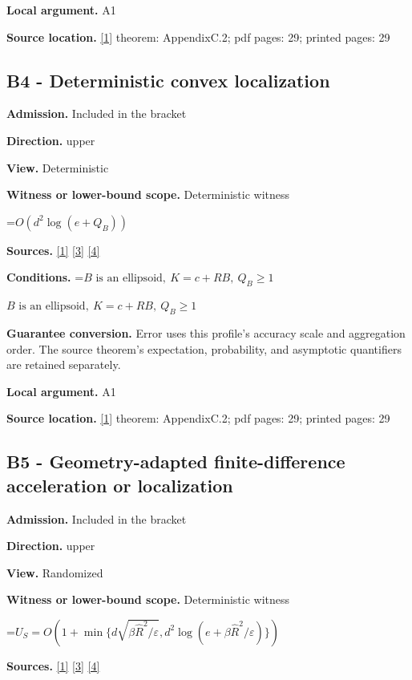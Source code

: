 \documentclass[10pt,a4paper]{article}
\newcommand{\AtlasMath}[1]{\par\begingroup\centering\setbox0=\hbox{$\displaystyle #1$}\ifdim\wd0>1.4\linewidth\typeout{ATLAS WIDE FORMULA: \the\wd0}\fi\ifdim\wd0>\linewidth\resizebox{\linewidth}{!}{\box0}\else\box0\fi\par\endgroup}
\newcommand{\AtlasInlineMath}[1]{\begingroup\setbox0=\hbox{$#1$}\ifdim\wd0>.4\linewidth\endgroup\AtlasMath{#1}\else\endgroup$#1$\fi}
\begin{document}
\textbf{Local argument.} A1

\textbf{Source location.} \href{https://arxiv.org/html/2610.00345v1}{[1]} theorem: AppendixC.2; pdf pages: 29; printed pages: 29

\subsection{B4 - Deterministic convex localization}
\textbf{Admission.} Included in the bracket

\textbf{Direction.} upper

\textbf{View.} Deterministic

\textbf{Witness or lower-bound scope.} Deterministic witness

\AtlasMath{O(d^2\log(e+Q_B))}
\textbf{Sources.} \href{https://arxiv.org/html/2610.00345v1}{[1]} \href{https://arxiv.org/html/2607.16558v2}{[3]} \href{https://www.mathnet.ru/php/archive.phtml?jrnid=mzm&option_lang=eng&paperid=1697&wshow=paper}{[4]}

\textbf{Conditions.} \AtlasInlineMath{B\text{ is an ellipsoid},\ K=c+RB,\ Q_B\ge1}

\textbf{Guarantee conversion.} Error uses this profile's accuracy scale and aggregation order. The source theorem's expectation, probability, and asymptotic quantifiers are retained separately.

\textbf{Local argument.} A1

\textbf{Source location.} \href{https://arxiv.org/html/2610.00345v1}{[1]} theorem: AppendixC.2; pdf pages: 29; printed pages: 29

\subsection{B5 - Geometry-adapted finite-difference acceleration or localization}
\textbf{Admission.} Included in the bracket

\textbf{Direction.} upper

\textbf{View.} Randomized

\textbf{Witness or lower-bound scope.} Deterministic witness

\AtlasMath{U_S=O(1+\min\{d\sqrt{\beta\widehat{R}^2/\varepsilon},d^2\log(e+\beta\widehat{R}^2/\varepsilon)\})}
\textbf{Sources.} \href{https://arxiv.org/html/2610.00345v1}{[1]} \href{https://arxiv.org/html/2607.16558v2}{[3]} \href{https://www.mathnet.ru/php/archive.phtml?jrnid=mzm&option_lang=eng&paperid=1697&wshow=paper}{[4]}
\end{document}
